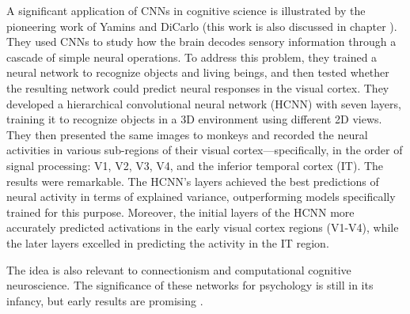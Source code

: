 A significant application of CNNs in cognitive science is illustrated by the pioneering work of Yamins and DiCarlo \cite{yamins2016using} (this work is also discussed in chapter ). They used CNNs to study how the brain decodes sensory information through a cascade of simple neural operations. To address this problem, they trained a neural network to recognize objects and living beings, and then tested whether the resulting network  could predict neural responses in the visual cortex. They developed a hierarchical convolutional neural network (HCNN) with seven layers, training it to recognize objects in a 3D environment using different 2D views. They then presented the same images to monkeys and recorded the neural activities in various sub-regions of their visual cortex—specifically, in the order of signal processing: V1, V2, V3, V4, and the inferior temporal cortex (IT).
The results were remarkable. The HCNN's layers achieved the best predictions of neural activity in terms of explained variance, outperforming models specifically trained for this purpose. Moreover, the initial layers of the HCNN more accurately predicted activations in the early visual cortex regions (V1-V4), while the later layers excelled in predicting the activity in the IT region.


The idea is also relevant to connectionism and computational cognitive neuroscience.  The significance of these networks for psychology is still in its infancy, but early results are promising \cite{zorzi2013modeling, ritter2017cognitive}.
